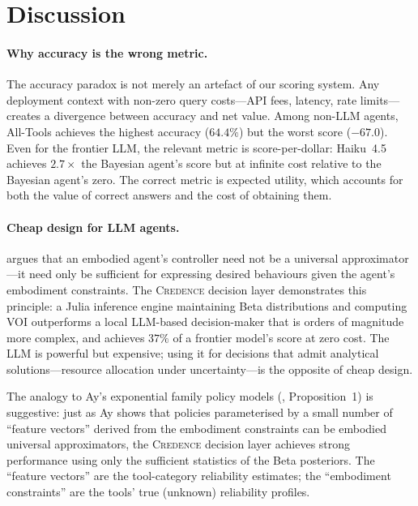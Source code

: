 \documentclass[11pt]{article}
\newcommand{\credence}{\textsc{Credence}}
\begin{document}
\section{Discussion}
\label{sec:discussion}

\paragraph{Why accuracy is the wrong metric.}
The accuracy paradox is not merely an artefact of our scoring system. Any deployment context with non-zero query costs---API fees, latency, rate limits---creates a divergence between accuracy and net value. Among non-LLM agents, All-Tools achieves the highest accuracy ($64.4\%$) but the worst score ($-67.0$). Even for the frontier LLM, the relevant metric is score-per-dollar: Haiku~4.5 achieves $2.7\times$ the Bayesian agent's score but at infinite cost relative to the Bayesian agent's zero. The correct metric is expected utility, which accounts for both the value of correct answers and the cost of obtaining them.

\paragraph{Cheap design for LLM agents.}
\citet{ay2015geometric} argues that an embodied agent's controller need not be a universal approximator---it need only be sufficient for expressing desired behaviours given the agent's embodiment constraints. The \credence{} decision layer demonstrates this principle: a Julia inference engine maintaining Beta distributions and computing VOI outperforms a local LLM-based decision-maker that is orders of magnitude more complex, and achieves $37\%$ of a frontier model's score at zero cost. The LLM is powerful but expensive; using it for decisions that admit analytical solutions---resource allocation under uncertainty---is the opposite of cheap design.

The analogy to Ay's exponential family policy models (\citealt{ay2015geometric}, Proposition~1) is suggestive: just as Ay shows that policies parameterised by a small number of ``feature vectors'' derived from the embodiment constraints can be embodied universal approximators, the \credence{} decision layer achieves strong performance using only the sufficient statistics of the Beta posteriors. The ``feature vectors'' are the tool-category reliability estimates; the ``embodiment constraints'' are the tools' true (unknown) reliability profiles.
\end{document}
